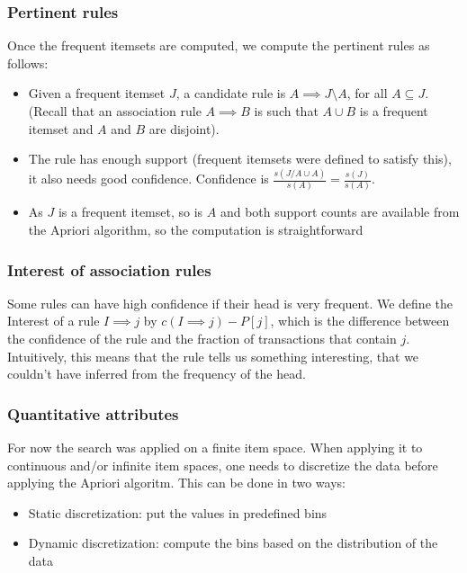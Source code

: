 \subsubsection{Pertinent rules}
Once the frequent itemsets are computed, we compute the pertinent rules as follows:
\begin{itemize}
\item Given a frequent itemset $J$, a candidate rule is $A \implies J \setminus A$, for all $A \subseteq J$. (Recall that an association rule $A \implies B$ is such that $A \cup B$ is a frequent itemset and $A$ and $B$ are disjoint).
\item The rule has enough support (frequent itemsets were defined to satisfy this), it also needs good confidence. Confidence is $\frac{s(J/A \cup A)}{s(A)} = \frac{s(J)}{s(A)}$.
\item As $J$ is a frequent itemset, so is $A$ and both support counts are available from the Apriori algorithm, so the computation is straightforward
\end{itemize}

\subsubsection{Interest of association rules}
Some rules can have high confidence if their head is very frequent.
We define the Interest of a rule $I \implies j$ by $c(I \implies j) - P[j]$, which is the difference between the confidence of the rule and the fraction of transactions that contain $j$.
Intuitively, this means that the rule tells us something interesting, that we couldn't have inferred from the frequency of the head.

\subsubsection{Quantitative attributes}
For now the search was applied on a finite item space. When applying it to continuous and/or infinite item spaces, one needs to discretize the data before applying the Apriori algoritm. This can be done in two ways:
\begin{itemize}
\item Static discretization: put the values in predefined bins
\item Dynamic discretization: compute the bins based on the distribution of the data
\end{itemize}

